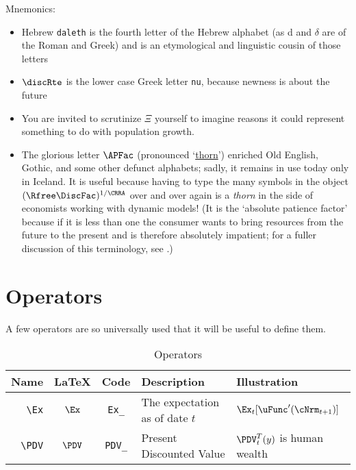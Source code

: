 \documentclass[12pt]{\econtex}
\begin{document}
Mnemonics:
\begin{itemize}
\item Hebrew \texttt{daleth} is the fourth letter of the Hebrew alphabet (as d and $\delta$ are of the Roman and Greek) and is an etymological and linguistic cousin of those letters
\item $\discRte$ is the lower case Greek letter \texttt{nu}, because newness is about the future
\item You are invited to scrutinize $\Xi$ yourself to imagine reasons it could represent something to do with population growth.
\item The glorious letter $\APFac$ (pronounced `\href{https://en.wikipedia.org/wiki/Thorn_(letter)}{thorn}') enriched Old English, Gothic, and some other defunct alphabets; sadly, it remains in use today only in Iceland.  It is useful because having to type the many symbols in the object $(\Rfree \DiscFac)^{1/\CRRA}$ over and over again is a \textit{thorn} in the side of economists working with dynamic models!  (It is the `absolute patience factor' because if it is less than one the consumer wants to bring resources from the future to the present and is therefore absolutely impatient; for a fuller discussion of this terminology, see \cite{carrollTractable}.)
\end{itemize}


\hypertarget{Operators}{}
\section{Operators}
A few operators are so universally used that it will be useful to define them.

\begin{table}[ht]
  \centering
  \begin{tabular}{|>{\ttfamily}rccll|}
    \hline
    Name    & \LaTeX         & Code & Description & Illustration
    \\ \hline
    \verb|\Ex|        & $\Ex$       & \texttt{Ex\_} & The expectation as of date $t$ & $\Ex_{t}[\uFunc^{\prime}(\cNrm_{t+1})]$
    \\   \verb|\PDV|        & $\PDV$       & \texttt{PDV\_} & Present Discounted Value & $\PDV_{t}^{T}(y)$ is human wealth
    \\	\hline
  \end{tabular}
  \caption{Operators}
  \label{table:Operators}
\end{table}



\hypertarget{Modifiers}{}
\end{document}
